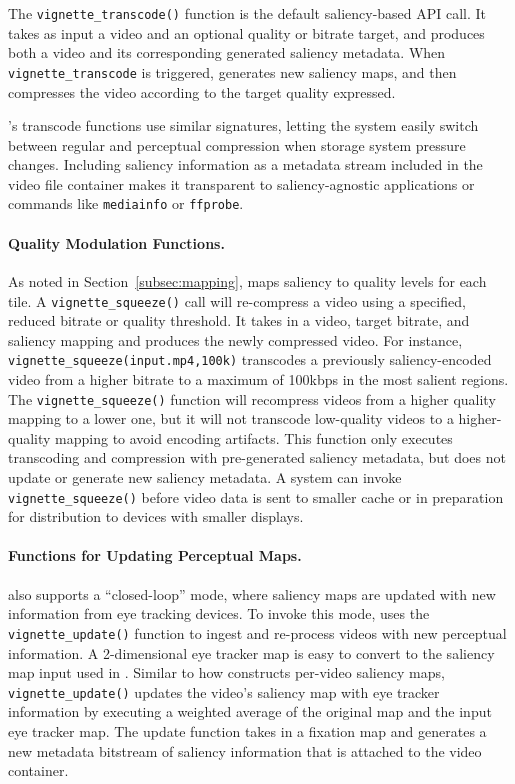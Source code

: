 The \texttt{vignette\_transcode()} function is the default saliency-based API call.
It takes as input a video and an optional quality or bitrate target, and produces both a video and its corresponding generated saliency metadata.
When \texttt{vignette\_transcode} is triggered, \nameStore generates new saliency maps, and then compresses the video according to the target quality expressed.

\nameStore's transcode functions use similar signatures, letting the system easily switch between regular and perceptual compression when storage system pressure changes.
Including saliency information as a metadata stream included in the video file container makes it transparent to saliency-agnostic applications or commands like \texttt{mediainfo} or \texttt{ffprobe}.

\paragraph{Quality Modulation Functions.}
As noted in Section~\ref{subsec:mapping}, \nameCompress maps saliency to quality levels for each tile.
A \texttt{vignette\_squeeze()} call will re-compress a video using a specified, reduced bitrate or quality threshold.
It takes in a video, target bitrate, and saliency mapping and produces the newly compressed video.
For instance, \texttt{vignette\_squeeze(input.mp4,100k)} transcodes a previously saliency-encoded video from a higher bitrate to a maximum of 100kbps in the most salient regions.
The \texttt{vignette\_squeeze()} function will recompress videos from a higher quality mapping to a lower one, but it will not transcode low-quality videos to a higher-quality mapping to avoid encoding artifacts.
This function only executes transcoding and compression with pre-generated saliency metadata, but does not update or generate new saliency metadata.
A system can invoke \texttt{vignette\_squeeze()} before video data is sent to smaller cache or in preparation for distribution to devices with smaller displays.

\paragraph{Functions for Updating Perceptual Maps.}
\nameStore also supports a ``closed-loop'' mode, where saliency maps are updated with new information from eye tracking devices.
To invoke this mode, \nameStore uses the \texttt{vignette\_update()} function to ingest and re-process videos with new perceptual information.
A 2-dimensional eye tracker map is easy to convert to the saliency map input used in \nameCompress.
Similar to how \name constructs per-video saliency maps, \texttt{vignette\_update()} updates the video's saliency map with eye tracker information by executing a weighted average of the original map and the input eye tracker map.
The update function takes in a fixation map and generates a new metadata bitstream of saliency information that is attached to the video container.

